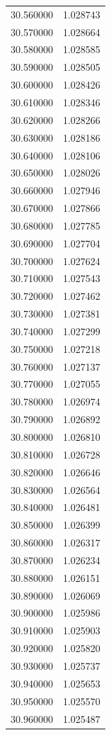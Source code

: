\begin{tabular}{rr}
30.560000 & 1.028743 \\
30.570000 & 1.028664 \\
30.580000 & 1.028585 \\
30.590000 & 1.028505 \\
30.600000 & 1.028426 \\
30.610000 & 1.028346 \\
30.620000 & 1.028266 \\
30.630000 & 1.028186 \\
30.640000 & 1.028106 \\
30.650000 & 1.028026 \\
30.660000 & 1.027946 \\
30.670000 & 1.027866 \\
30.680000 & 1.027785 \\
30.690000 & 1.027704 \\
30.700000 & 1.027624 \\
30.710000 & 1.027543 \\
30.720000 & 1.027462 \\
30.730000 & 1.027381 \\
30.740000 & 1.027299 \\
30.750000 & 1.027218 \\
30.760000 & 1.027137 \\
30.770000 & 1.027055 \\
30.780000 & 1.026974 \\
30.790000 & 1.026892 \\
30.800000 & 1.026810 \\
30.810000 & 1.026728 \\
30.820000 & 1.026646 \\
30.830000 & 1.026564 \\
30.840000 & 1.026481 \\
30.850000 & 1.026399 \\
30.860000 & 1.026317 \\
30.870000 & 1.026234 \\
30.880000 & 1.026151 \\
30.890000 & 1.026069 \\
30.900000 & 1.025986 \\
30.910000 & 1.025903 \\
30.920000 & 1.025820 \\
30.930000 & 1.025737 \\
30.940000 & 1.025653 \\
30.950000 & 1.025570 \\
30.960000 & 1.025487 \\

\end{tabular}
